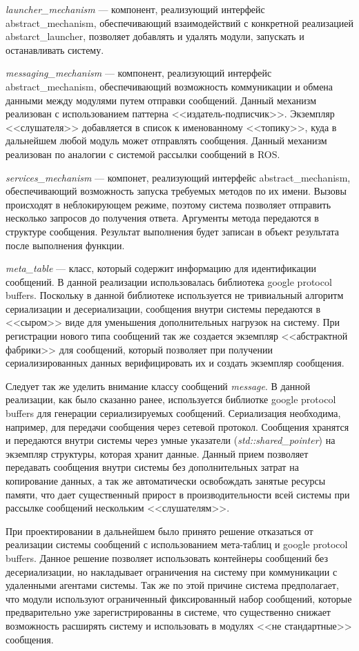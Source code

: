 \textit{launcher\_mechanism} --- компонент, реализующий интерфейс abstract\_mechanism, обеспечивающий взаимодействий с конкретной реализацией abstarct\_launcher, позволяет добавлять и удалять модули, запускать и останавливать систему.

\textit{messaging\_mechanism} --- компонент, реализующий интерфейс abstract\_mechanism, обеспечивающий возможность коммуникации и обмена данными между модулями путем отправки сообщений. Данный механизм реализован с использованием паттерна <<издатель-подписчик>>. Экземпляр <<слушателя>> добавляется в список к именованному <<топику>>, куда в дальнейшем любой модуль может отправлять сообщения. Данный механизм реализован по аналогии с системой рассылки сообщений в ROS.

\textit{services\_mechanism} --- компонет, реализующий интерфейс abstract\_mechanism, обеспечивающий возможность запуска требуемых методов по их имени. Вызовы происходят в неблокирующем режиме, поэтому система позволяет отправить несколько запросов до получения ответа. Аргументы метода передаются в структуре сообщения. Результат выполнения будет записан в объект результата после выполнения функции. 

\textit{meta\_table} --- класс, который содержит информацию для идентификации сообщений. В данной реализации использовалась библиотека google protocol buffers. Поскольку в данной библиотеке используется не тривиальный алгоритм сериализации и десериализации, сообщения внутри системы передаются в <<сыром>> виде для уменьшения дополнительных нагрузок на систему. При регистрации нового типа сообщений так же создается экземпляр <<абстрактной фабрики>> для сообщений, который позволяет при получении сериализированных данных верифицировать их и создать экземпляр сообщения.

Следует так же уделить внимание классу сообщений \textit{message}. В данной реализации, как было сказанно ранее, используется библиотке google protocol buffers для генерации сериализируемых сообщений. Сериализация необходима, например, для передачи сообщения через сетевой протокол. Сообщения хранятся и передаются внутри системы через умные указатели (\textit{std::shared\_pointer}) на экземпляр структуры, которая хранит данные. Данный прием позволяет передавать сообщения внутри системы без дополнительных затрат на копирование данных, а так же автоматически освобождать занятые ресурсы памяти, что дает существенный прирост в производительности всей системы при рассылке сообщений нескольким <<слушателям>>.

При проектировании в дальнейшем было принято решение отказаться от реализации системы сообщений с использованием мета-таблиц и google protocol buffers. Данное решение позволяет использовать контейнеры сообщений без десериализации, но накладывает ограничения на систему при коммуникации с удаленными агентами системы. Так же по этой причине система предполагает, что модули используют ограниченный фиксированный набор сообщений, которые предварительно уже зарегистрированны в системе, что существенно снижает возможность расширять систему и использовать в модулях <<не стандартные>> сообщения.

